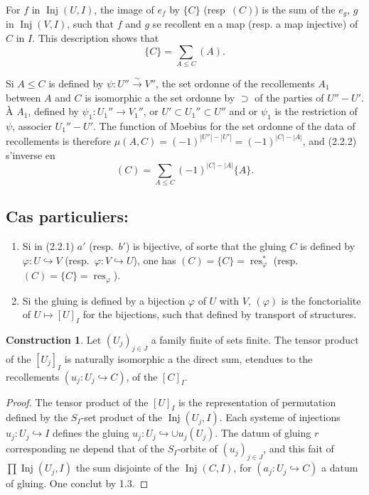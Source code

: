 \documentclass[11pt,a4paper]{article}
\theoremstyle{plain}
\theoremstyle{definition}
\newtheorem{construction}[theorem]{Construction}
\DeclareMathOperator{\Inj}{Inj}
\DeclareMathOperator{\res}{res}
\newcommand{\isom}{\xrightarrow{\sim}}
\newcommand{\inj}{\hookrightarrow}
\begin{document}
For $f$ in $\Inj(U, I)$, the image of $e_f$ by $\{C\}$ (resp~$(C)$) is the sum of the $e_g$, $g$ in $\Inj(V, I)$, such that $f$ and $g$ se recollent en a map (resp. a map injective) of $C$ in $I$. This description shows that
\begin{equation}
\{C\} = \sum_{A \leq C} (A). \tag{2.2.2}
\end{equation}

Si $A \leq C$ is defined by $\psi : U'' \isom V''$, the set ordonne of the recollements $A_1$ between $A$ and $C$ is isomorphic a the set ordonne by $\supset$ of the parties of $U'' - U'$. \`A $A_1$, defined by $\psi_1 : U_1'' \to V_1''$, or $U' \subset U_1'' \subset U''$ and or $\psi_1$ is the restriction of $\psi$, associer $U_1'' - U'$. The function of Moebius for the set ordonne of the data of recollements is therefore $\mu(A,C) = (-1)^{|U''| - |U'|} = (-1)^{|C| - |A|}$, and (2.2.2) s'inverse en
\begin{equation}
(C) = \sum_{A \leq C} (-1)^{|C| - |A|} \{A\}. \tag{2.2.3}
\end{equation}

\subsection{Cas particuliers:}

\begin{enumerate}[label=(\roman*)]
\item Si in (2.2.1) $a'$ (resp.~$b'$) is bijective, of sorte that the gluing $C$ is defined by $\varphi : U \inj V$ (resp.~$\varphi : V \inj U$), one has $(C) = \{C\} = \res^*_\varphi$ (resp.~$(C) = \{C\} = \res_\varphi$).
\item Si the gluing is defined by a bijection $\varphi$ of $U$ with $V$, $(\varphi)$ is the fonctorialite of $U \mapsto [U]_I$ for the bijections, such that defined by transport of structures.
\end{enumerate}

\begin{construction}
Let $(U_j)_{j \in J}$ a family finite of sets finite. The tensor product of the $[U_j]_I$ is naturally isomorphic a the direct sum, etendues to the recollements $(u_j : U_j \inj C)$, of the $[C]_I$.
\end{construction}

\begin{proof}
The tensor product of the $[U]_I$ is the representation of permutation defined by the $S_I$-set product of the $\Inj(U_j, I)$. Each systeme of injections $u_j : U_j \inj I$ defines the gluing $u_j : U_j \inj \cup u_j(U_j)$. The datum of gluing $r$ corresponding ne depend that of the $S_I$-orbite of $(u_j)_{j \in J}$, and this fait of $\prod \Inj(U_j, I)$ the sum disjointe of the $\Inj(C, I)$, for $(a_j : U_j \inj C)$ a datum of gluing. One conclut by 1.3.
\end{proof}
\end{document}
